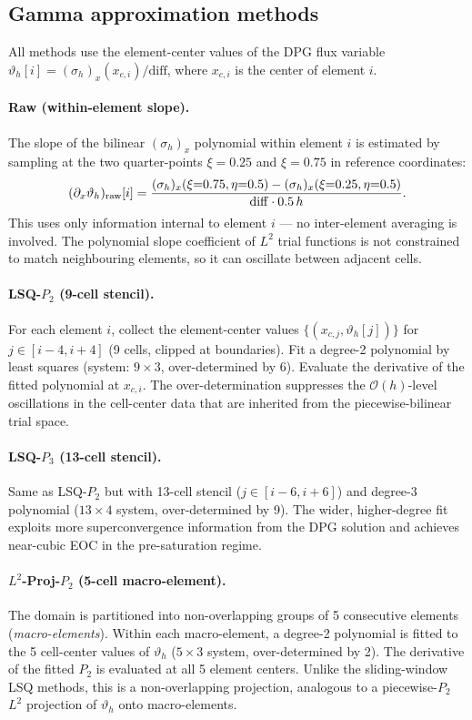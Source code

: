 \documentclass[11pt,a4paper]{article}
\newcommand{\bigo}[1]{\mathcal{O}(#1)}
\newcommand{\vth}{\vartheta}
\begin{document}
\subsection{Gamma approximation methods}
\label{sec:methods}

All methods use the element-center values of the DPG flux variable
$\vth_h[i] = (\sigma_h)_x(x_{c,i}) / \mathrm{diff}$,
where $x_{c,i}$ is the center of element $i$.

\paragraph{Raw (within-element slope).}
The slope of the bilinear $(\sigma_h)_x$ polynomial within element $i$
is estimated by sampling at the two quarter-points
$\xi = 0.25$ and $\xi = 0.75$ in reference coordinates:
\[
  (\partial_x\vth_h)_{\rm raw}[i]
  = \frac{(\sigma_h)_x(\xi{=}0.75,\eta{=}0.5) - (\sigma_h)_x(\xi{=}0.25,\eta{=}0.5)}
         {\mathrm{diff} \cdot 0.5\,h}.
\]
This uses only information internal to element $i$ --- no inter-element
averaging is involved.  The polynomial slope coefficient of $L^2$
trial functions is not constrained to match neighbouring elements,
so it can oscillate between adjacent cells.

\paragraph{LSQ-$P_2$ (9-cell stencil).}
For each element $i$, collect the element-center values
$\{(x_{c,j}, \vth_h[j])\}$ for $j \in [i{-}4, i{+}4]$ (9 cells,
clipped at boundaries).  Fit a degree-2 polynomial by least squares
(system: $9 \times 3$, over-determined by 6).
Evaluate the derivative of the fitted polynomial at $x_{c,i}$.
The over-determination suppresses the $\bigo{h}$-level oscillations
in the cell-center data that are inherited from the piecewise-bilinear
trial space.

\paragraph{LSQ-$P_3$ (13-cell stencil).}
Same as LSQ-$P_2$ but with 13-cell stencil ($j \in [i{-}6, i{+}6]$)
and degree-3 polynomial ($13 \times 4$ system, over-determined by 9).
The wider, higher-degree fit exploits more superconvergence information
from the DPG solution and achieves near-cubic EOC in the pre-saturation
regime.

\paragraph{$L^2$-Proj-$P_2$ (5-cell macro-element).}
The domain is partitioned into non-overlapping groups of 5 consecutive
elements (\emph{macro-elements}).  Within each macro-element, a degree-2
polynomial is fitted to the 5 cell-center values of $\vth_h$ ($5 \times 3$
system, over-determined by 2).  The derivative of the fitted $P_2$ is
evaluated at all 5 element centers.  Unlike the sliding-window LSQ methods,
this is a non-overlapping projection, analogous to a piecewise-$P_2$
$L^2$ projection of $\vth_h$ onto macro-elements.
\end{document}
